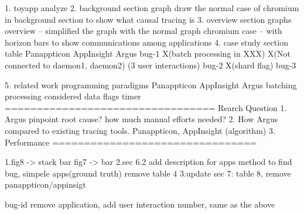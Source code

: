 1. toyapp analyze
2. background section graph
    draw the normal case of chromium in background section to show what causal tracing is
3. overview section graphs
    overview -- simplified the graph with the normal graph
    chromium case -- with horizon bars to show communications among applications
4. case study section table
            Panappticon                         AppInsight                                  Argus
    bug-1   X(batch processing in XXX)         X(Not connected to daemon1, daemon2)         (3 user interactions)
    bug-2   X(shard flag)
    bug-3 

5. related work
    programming paradigms   Panappticon          AppInsight                 Argus 
    batching processing                                                  considered
    data flags
    timer
=================================
Rearch Question
	1. Argus pinpoint root cause? how much manual efforts needed?
	2. How Argus compared to existing tracing tools. Panappticon, AppInsight (algorithm) 
	3. Performance
================================

1.fig8 -> stack bar
  fig7 -> bar
2.sec 6.2
add description for apps 
method to find bug, simpele apps(ground truth)
remove table 4
3.update sec 7:
table 8, remove panappticon/appinsigt


bug-id remove application, add user interaction number, same as the above
